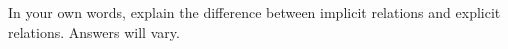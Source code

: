 {In your own words, explain the difference between implicit relations and explicit relations.
}
{Answers will vary.}
